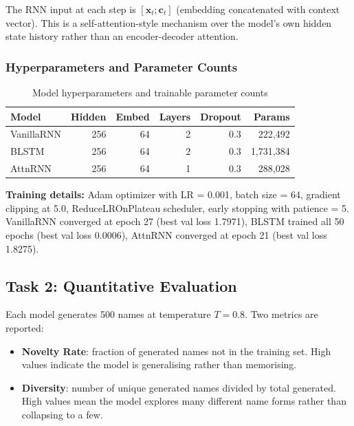 \documentclass[11pt, a4paper]{article}
\begin{document}
The RNN input at each step is $[\mathbf{x}_t; \mathbf{c}_t]$ (embedding concatenated with context vector). This is a self-attention-style mechanism over the model's own hidden state history rather than an encoder-decoder attention.

\subsubsection{Hyperparameters and Parameter Counts}

\begin{table}[H]
\centering
\caption{Model hyperparameters and trainable parameter counts}
\begin{tabular}{lrrrrr}
\toprule
\textbf{Model} & \textbf{Hidden} & \textbf{Embed} & \textbf{Layers} & \textbf{Dropout} & \textbf{Params} \\
\midrule
VanillaRNN  & 256 & 64 & 2 & 0.3 & 222,492 \\
BLSTM       & 256 & 64 & 2 & 0.3 & 1,731,384 \\
AttnRNN     & 256 & 64 & 1 & 0.3 & 288,028 \\
\bottomrule
\end{tabular}
\end{table}

\textbf{Training details:} Adam optimizer with LR = 0.001, batch size = 64, gradient clipping at 5.0, ReduceLROnPlateau scheduler, early stopping with patience = 5. VanillaRNN converged at epoch 27 (best val loss 1.7971), BLSTM trained all 50 epochs (best val loss 0.0006), AttnRNN converged at epoch 21 (best val loss 1.8275).

\subsection{Task 2: Quantitative Evaluation}

Each model generates 500 names at temperature $T = 0.8$. Two metrics are reported:

\begin{itemize}
    \item \textbf{Novelty Rate}: fraction of generated names not in the training set. High values indicate the model is generalising rather than memorising.
    \item \textbf{Diversity}: number of unique generated names divided by total generated. High values mean the model explores many different name forms rather than collapsing to a few.
\end{itemize}
\end{document}
